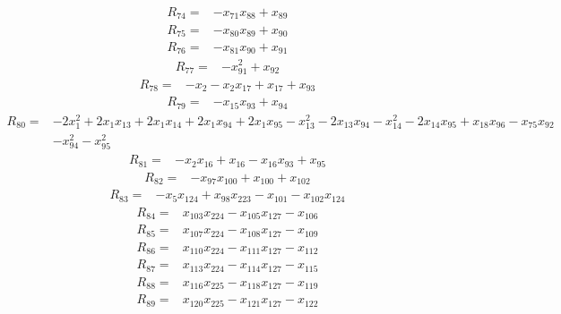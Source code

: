 \begin{align*}
 R_{74}={}&-x_{71}x_{88} +x_{89}
\end{align*}
\begin{align*}
 R_{75}={}&-x_{80}x_{89} +x_{90}
\end{align*}
\begin{align*}
 R_{76}={}&-x_{81}x_{90} +x_{91}
\end{align*}
\begin{align*}
 R_{77}={}&-x_{91}^{2} +x_{92}
\end{align*}
\begin{align*}
 R_{78}={}&-x_{2} -x_{2}x_{17} +x_{17} +x_{93}
\end{align*}
\begin{align*}
 R_{79}={}&-x_{15}x_{93} +x_{94}
\end{align*}
\begin{align*}
 R_{80}={}&-2x_{1}^{2} +2x_{1}x_{13} +2x_{1}x_{14} +2x_{1}x_{94} +2x_{1}x_{95} -x_{13}^{2} -2x_{13}x_{94} -x_{14}^{2} -2x_{14}x_{95} +x_{18}x_{96} -x_{75}x_{92}\\
 &-x_{94}^{2} -x_{95}^{2}
\end{align*}
\begin{align*}
 R_{81}={}&-x_{2}x_{16} +x_{16} -x_{16}x_{93} +x_{95}
\end{align*}
\begin{align*}
 R_{82}={}&-x_{97}x_{100} +x_{100} +x_{102}
\end{align*}
\begin{align*}
 R_{83}={}&-x_{5}x_{124} +x_{98}x_{223} -x_{101} -x_{102}x_{124}
\end{align*}
\begin{align*}
 R_{84}={}&x_{103}x_{224} -x_{105}x_{127} -x_{106}
\end{align*}
\begin{align*}
 R_{85}={}&x_{107}x_{224} -x_{108}x_{127} -x_{109}
\end{align*}
\begin{align*}
 R_{86}={}&x_{110}x_{224} -x_{111}x_{127} -x_{112}
\end{align*}
\begin{align*}
 R_{87}={}&x_{113}x_{224} -x_{114}x_{127} -x_{115}
\end{align*}
\begin{align*}
 R_{88}={}&x_{116}x_{225} -x_{118}x_{127} -x_{119}
\end{align*}
\begin{align*}
 R_{89}={}&x_{120}x_{225} -x_{121}x_{127} -x_{122}
\end{align*}
